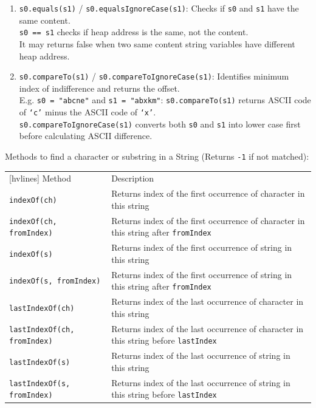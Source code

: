 \documentclass{article}
\begin{document}
\begin{enumerate}
	\item \texttt{s0.equals(s1)} / \texttt{s0.equalsIgnoreCase(s1)}: Checks if \texttt{s0} and \texttt{s1} have the same content.\\
	\texttt{s0 == s1} checks if heap address is the same, not the content.\\
	It may returns false when two same content string variables have different heap address.
	\item \texttt{s0.compareTo(s1)} / \texttt{s0.compareToIgnoreCase(s1)}: Identifies minimum index of indifference and returns the offset.\\
	E.g. \texttt{s0 = "abcne"} and \texttt{s1 = "abxkm"}: \texttt{s0.compareTo(s1)} returns ASCII code of \texttt{`c'} minus the ASCII code of \texttt{`x'}.\\
	\texttt{s0.compareToIgnoreCase(s1)} converts both \texttt{s0} and \texttt{s1} into lower case first before calculating ASCII difference.
\end{enumerate}
\newpage

Methods to find a character or substring in a String (Returns \texttt{-1} if not matched): 

\begin{table}[h!]
	\centering
	\begin{NiceTabular}{||ll||}[hvlines]
		\RowStyle{\bfseries}Method & Description\\
		\texttt{indexOf(ch)} & Returns index of the first occurrence of character in this string\\
		\texttt{indexOf(ch, fromIndex)} & Returns index of the first occurrence of character in this string after \texttt{fromIndex}\\
		\texttt{indexOf(s)} & Returns index of the first occurrence of string in this string\\
		\texttt{indexOf(s, fromIndex)} & Returns index of the first occurrence of string in this string after \texttt{fromIndex}\\
		\texttt{lastIndexOf(ch)} & Returns index of the last occurrence of character in this string\\
		\texttt{lastIndexOf(ch, fromIndex)} & Returns index of the last occurrence of character in this string before \texttt{lastIndex}\\
		\texttt{lastIndexOf(s)} & Returns index of the last occurrence of string in this string\\
		\texttt{lastIndexOf(s, fromIndex)} & Returns index of the last occurrence of string in this string before \texttt{lastIndex}
	\end{NiceTabular}
\end{table}
\end{document}
